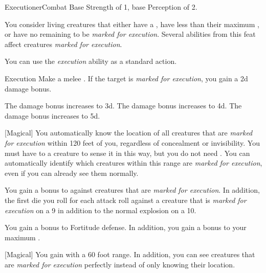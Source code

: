     \begin{feat}{Executioner}{Combat}
        \featpres Base Strength of 1, base Perception of 2.

         You consider living creatures that either have a , have less than their maximum , or have no remaining  to be \textit{marked for execution}.
        Several abilities from this feat affect creatures \textit{marked for execution}.

         You can use the \textit{execution} ability as a standard action.
        \begin{freeability}{Execution}
            Make a melee .
            If the target is \textit{marked for execution}, you gain a \plus2d damage bonus.

            \rankline
             The damage bonus increases to \plus3d.
             The damage bonus increases to \plus4d.
             The damage bonus increases to \plus5d.
        \end{freeability}

        [Magical] You automatically know the location of all creatures that are \textit{marked for execution} within 120 feet of you, regardless of concealment or invisibility.
        You must have  to a creature to sense it in this way, but you do not need .
        You can automatically identify which creatures within this range are \textit{marked for execution}, even if you can already see them normally.

         You gain a  bonus to  against creatures that are \textit{marked for execution}.
        In addition, the first die you roll for each attack roll against a creature that is \textit{marked for execution}  on a 9 in addition to the normal explosion on a 10.

         You gain a  bonus to Fortitude defense.
        In addition, you gain a  bonus to your maximum .

        [Magical] You gain  with a 60 foot range.
        In addition, you can see creatures that are \textit{marked for execution} perfectly instead of only knowing their location.


\end{feat}
